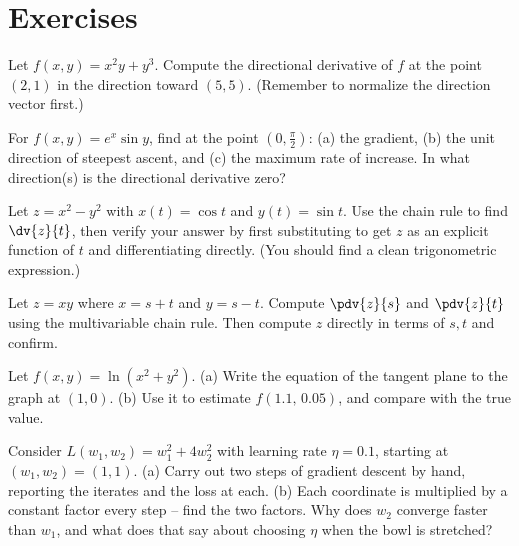 \section{Exercises}
\label{ch33:exercises}

\begin{exercise}
\label{ch33:exr-dir}
Let $f(x,y) = x^2 y + y^3$. Compute the directional derivative of $f$ at the point
$(2,1)$ in the direction toward $(5,5)$. (Remember to normalize the direction
vector first.)
\end{exercise}

\begin{exercise}
\label{ch33:exr-steep}
For $f(x,y) = e^{x}\sin y$, find at the point $(0,\tfrac{\pi}{2})$: (a) the
gradient, (b) the unit direction of steepest ascent, and (c) the maximum rate of
increase. In what direction(s) is the directional derivative zero?
\end{exercise}

\begin{exercise}
\label{ch33:exr-chain1}
Let $z = x^2 - y^2$ with $x(t) = \cos t$ and $y(t) = \sin t$. Use the chain rule to
find $\dv{z}{t}$, then verify your answer by first substituting to get $z$ as an
explicit function of $t$ and differentiating directly. (You should find a clean
trigonometric expression.)
\end{exercise}

\begin{exercise}
\label{ch33:exr-chain2}
Let $z = x y$ where $x = s + t$ and $y = s - t$. Compute $\pdv{z}{s}$ and
$\pdv{z}{t}$ using the multivariable chain rule. Then compute $z$ directly in terms
of $s,t$ and confirm.
\end{exercise}

\begin{exercise}
\label{ch33:exr-plane}
Let $f(x,y) = \ln(x^2 + y^2)$. (a) Write the equation of the tangent plane to the
graph at $(1,0)$. (b) Use it to estimate $f(1.1,\,0.05)$, and compare with the true
value.
\end{exercise}

\begin{exercise}
\label{ch33:exr-gd}
Consider $L(w_1,w_2) = w_1^2 + 4w_2^2$ with learning rate $\eta = 0.1$, starting at
$(w_1,w_2)=(1,1)$. (a) Carry out two steps of gradient descent by hand, reporting
the iterates and the loss at each. (b) Each coordinate is multiplied by a constant
factor every step -- find the two factors. Why does $w_2$ converge faster than
$w_1$, and what does that say about choosing $\eta$ when the bowl is stretched?
\end{exercise}

